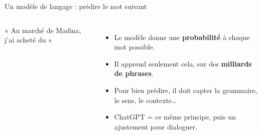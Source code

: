 
\newcommand{\cerveau}[2]{%
  \begin{tikzpicture}
    \node[inner sep=0pt, anchor=south west] (im) at (0,0) {\photo{height=#1}{images/cerveau_lobes.png}};
    \begin{scope}[x={(im.south east)}, y={(im.north west)}]#2\end{scope}
  \end{tikzpicture}}
\newcommand{\reseaulangage}{%
  \fill[rouge, opacity=0.75] (0.235,0.47) ellipse (0.07 and 0.075);
  \fill[rouge, opacity=0.75, rotate around={-8:(0.53,0.36)}] (0.53,0.36) ellipse (0.20 and 0.05);
  \fill[rouge, opacity=0.6] (0.30,0.62) ellipse (0.05 and 0.05);}

\begin{frame}{Un modèle de langage : prédire le mot suivant}
  \begin{columns}[c,onlytextwidth]
    \centering
    {« Au marché de Madina, j'ai acheté du \jaun{\underline{\hspace{1.0cm}}} »}\\[0.8em]
    \small
    \begin{itemize}
      \item<2-> Le modèle donne une \textbf{probabilité} à chaque mot possible.
      \item<3-> Il apprend seulement cela, sur des \textbf{milliards de phrases}.
      \item<4-> Pour bien prédire, il doit capter la grammaire, le sens, le contexte\dots
      \item<5-> ChatGPT = ce même principe, puis un ajustement pour dialoguer.
    \end{itemize}
  \end{columns}
  \vspace{0.4em}
\end{frame}

